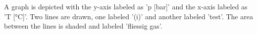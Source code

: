 A graph is depicted with the y-axis labeled as 'p [bar]' and the x-axis labeled as 'T [°C]'. Two lines are drawn, one labeled '(i)' and another labeled 'test'. The area between the lines is shaded and labeled 'fliessig gas'.